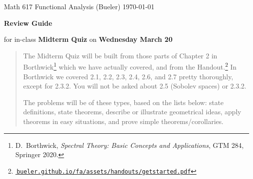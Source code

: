 \documentclass[12pt]{amsart}
\newcommand{\textbook}{D.~Borthwick, \emph{Spectral Theory: Basic Concepts and Applications}, GTM 284, Springer 2020}
\begin{document}
\scriptsize \noindent Math 617 Functional Analysis (Bueler) \hfill \today
\thispagestyle{empty}

\bigskip
\LARGE\centerline{\textbf{Review Guide}}

\medskip
\Large\centerline{for in-class \textbf{Midterm Quiz} on \textbf{Wednesday March 20}}

\normalsize
\bigskip
\begin{quote}
The Midterm Quiz will be built from those parts of Chapter 2 in Borthwick\footnote{\textbook.} which we have actually covered, and from the Handout.\footnote{\href{https://bueler.github.io/fa/assets/handouts/getstarted.pdf}{\,\texttt{bueler.github.io/fa/assets/handouts/getstarted.pdf}}}  In Borthwick we covered 2.1, 2.2, 2.3, 2.4, 2.6, and 2.7 pretty thoroughly, except for 2.3.2.  You will not be asked about 2.5 (Sobolev spaces) or 2.3.2.

The problems will be of these types, based on the lists below: state definitions, state theorems, describe or illustrate geometrical ideas, apply theorems in easy situations, and prove simple theorems/corollaries.
\end{quote}
\bigskip
\end{document}
